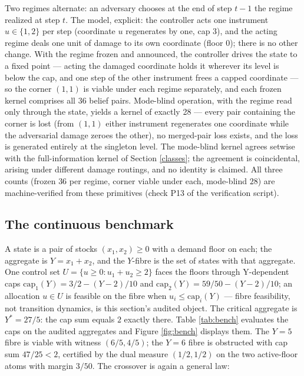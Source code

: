 \documentclass[10pt,twocolumn]{article}
\theoremstyle{definition}
\begin{document}
Two regimes alternate: an adversary chooses at the end of step
\(t - 1\) the regime realized at step \(t\). The model, explicit: the
controller acts one instrument \(u \in \{1,2\}\) per step (coordinate
\(u\) regenerates by one, cap \(3\)), and the acting regime deals one
unit of damage to its own coordinate (floor \(0\)); there is no other
change. With the regime frozen and announced, the controller drives the state
to a fixed point --- acting the damaged coordinate holds it wherever
its level is below the cap, and one step of the other instrument frees
a capped coordinate --- so the corner \((1,1)\) is
viable under each regime separately, and each frozen kernel comprises
all \(36\) belief pairs. Mode-blind operation, with the regime read
only through the state, yields a kernel of exactly 28 --- every pair
containing the corner is lost (from \((1,1)\) either instrument
regenerates one coordinate while the adversarial damage zeroes the
other), no merged-pair loss exists, and the loss is generated entirely
at the singleton level. The mode-blind kernel
agrees setwise with the full-information kernel of Section
\ref{classes}; the agreement is coincidental, arising under different
damage routings, and no identity is claimed. All three counts (frozen
\(36\) per regime, corner viable under each, mode-blind \(28\)) are
machine-verified from these primitives (check P13 of the verification script).

\subsection{The continuous benchmark}\label{benchmark}

A state is a pair of stocks \((x_1, x_2) \ge 0\) with a demand floor
on each; the aggregate is \(Y = x_1 + x_2\), and the \(Y\)-fibre is
the set of states with that aggregate. One control set
\(U = \{u \ge 0 : u_1 + u_2 \ge 2\}\) faces the floors through
Y-dependent caps \(\mathrm{cap}_1(Y) = 3/2 - (Y - 2)/10\) and
\(\mathrm{cap}_2(Y) = 59/50 - (Y - 2)/10\); an allocation \(u \in U\)
is feasible on the fibre when \(u_i \le \mathrm{cap}_i(Y)\) --- fibre
feasibility, not transition dynamics, is this section's audited object.
The critical aggregate is \(Y^{*} = 27/5\): the cap sum equals \(2\)
exactly there. Table
\ref{tab:bench} evaluates the caps on the audited aggregates and Figure
\ref{fig:bench} displays them. The \(Y = 5\) fibre is viable with
witness \((6/5, 4/5)\); the \(Y = 6\) fibre is obstructed with cap sum
\(47/25 < 2\), certified by the dual measure \((1/2, 1/2)\) on the two
active-floor atoms with margin \(3/50\). The crossover is again a general law:
\end{document}
